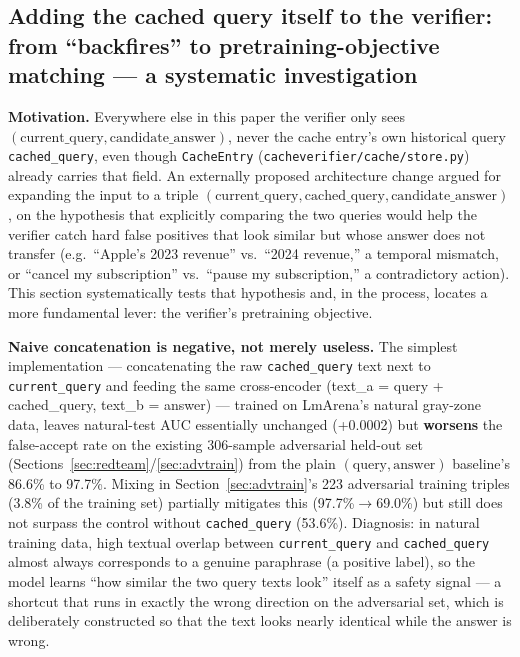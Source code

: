 \documentclass[11pt]{article}
\begin{document}
\subsection{Adding the cached query itself to the verifier: from ``backfires'' to pretraining-objective matching --- a systematic investigation}
\label{sec:qcached}

\textbf{Motivation.} Everywhere else in this paper the verifier only sees $(\text{current\_query}, \text{candidate\_answer})$, never the cache entry's own historical query \texttt{cached\_\allowbreak{}query}, even though \texttt{Cache\allowbreak{}Entry} (\texttt{cacheverifier/\allowbreak{}cache/\allowbreak{}store.\allowbreak{}py}) already carries that field. An externally proposed architecture change argued for expanding the input to a triple $(\text{current\_query},\allowbreak \text{cached\_query},\allowbreak \text{candidate\_answer})$, on the hypothesis that explicitly comparing the two queries would help the verifier catch hard false positives that look similar but whose answer does not transfer (e.g.\ ``Apple's 2023 revenue'' vs.\ ``2024 revenue,'' a temporal mismatch, or ``cancel my subscription'' vs.\ ``pause my subscription,'' a contradictory action). This section systematically tests that hypothesis and, in the process, locates a more fundamental lever: the verifier's pretraining objective.

\textbf{Naive concatenation is negative, not merely useless.} The simplest implementation --- concatenating the raw \texttt{cached\_\allowbreak{}query} text next to \texttt{current\_\allowbreak{}query} and feeding the same cross-encoder (text\_a = query + cached\_query, text\_b = answer) --- trained on LmArena's natural gray-zone data, leaves natural-test AUC essentially unchanged (+0.0002) but \textbf{worsens} the false-accept rate on the existing 306-sample adversarial held-out set (Sections~\ref{sec:redteam}/\ref{sec:advtrain}) from the plain $(\text{query}, \text{answer})$ baseline's 86.6\% to 97.7\%. Mixing in Section~\ref{sec:advtrain}'s 223 adversarial training triples (3.8\% of the training set) partially mitigates this (97.7\%$\to$69.0\%) but still does not surpass the control without \texttt{cached\_\allowbreak{}query} (53.6\%). Diagnosis: in natural training data, high textual overlap between \texttt{current\_\allowbreak{}query} and \texttt{cached\_\allowbreak{}query} almost always corresponds to a genuine paraphrase (a positive label), so the model learns ``how similar the two query texts look'' itself as a safety signal --- a shortcut that runs in exactly the wrong direction on the adversarial set, which is deliberately constructed so that the text looks nearly identical while the answer is wrong.
\end{document}

